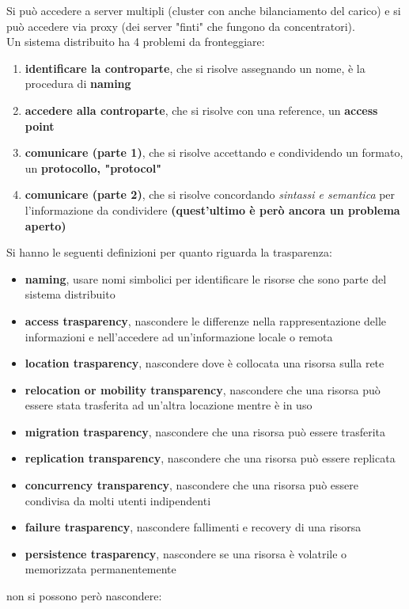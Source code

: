 \documentclass[a4paper,12pt, oneside]{book}
\begin{document}
Si può accedere a server multipli (cluster con anche bilanciamento del carico) e si può accedere via proxy (dei server "finti" che fungono da concentratori).\\
Un sistema distribuito ha 4 problemi da fronteggiare:
\begin{enumerate}
\item \textbf{identificare la controparte}, che si risolve assegnando un nome, è la procedura di \textbf{naming}
\item \textbf{accedere alla controparte}, che si risolve con una reference, un \textbf{access point}
\item \textbf{comunicare (parte 1)}, che si risolve accettando e condividendo un formato, un \textbf{protocollo, "protocol"}
\item \textbf{comunicare (parte 2)}, che si risolve concordando \textit{sintassi e semantica} per l'informazione da condividere \textbf{(quest'ultimo è però ancora un problema aperto)}
\end{enumerate}
Si hanno le seguenti definizioni per quanto riguarda la trasparenza:
\begin{itemize}
\item \textbf{naming}, usare nomi simbolici per identificare le risorse che sono parte del sistema distribuito
\item \textbf{access trasparency}, nascondere le differenze nella rappresentazione delle informazioni e nell'accedere ad un'informazione locale o remota 
\item \textbf{location trasparency}, nascondere dove è collocata una risorsa sulla rete
\item  \textbf{relocation or mobility transparency}, nascondere che una risorsa può essere stata trasferita ad un'altra locazione mentre è in uso
\item \textbf{migration trasparency}, nascondere che una risorsa può essere trasferita
\item \textbf{replication transparency}, nascondere che una risorsa può essere replicata
\item \textbf{concurrency transparency}, nascondere che una risorsa può essere condivisa da molti utenti indipendenti
\item \textbf{failure trasparency}, nascondere fallimenti e recovery di una risorsa
\item \textbf{persistence trasparency}, nascondere se una risorsa è volatrile o memorizzata permanentemente
\end{itemize}
non si possono però nascondere:
\end{document}
